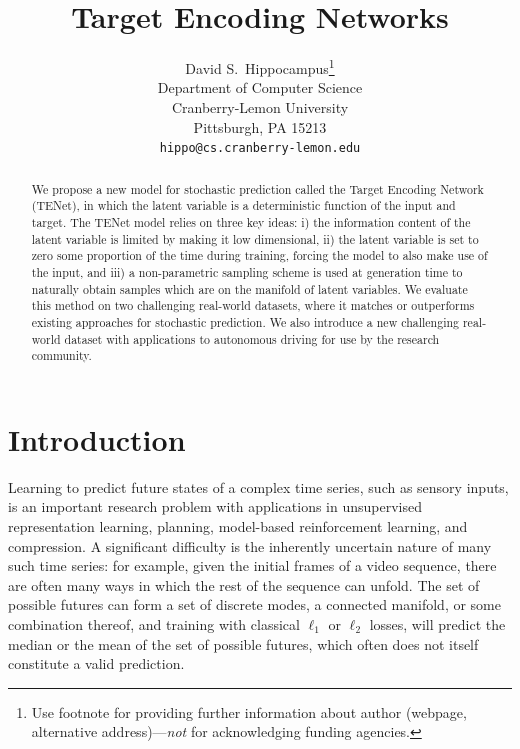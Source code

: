 \documentclass{article}
\title{Target Encoding Networks}
\author{
  David S.~Hippocampus\thanks{Use footnote for providing further
    information about author (webpage, alternative
    address)---\emph{not} for acknowledging funding agencies.} \\
  Department of Computer Science\\
  Cranberry-Lemon University\\
  Pittsburgh, PA 15213 \\
  \texttt{hippo@cs.cranberry-lemon.edu} \\
}
\begin{document}

\maketitle

\begin{abstract}
  We propose a new model for stochastic prediction called the Target Encoding Network (TENet), in which the latent variable is a deterministic function of the input and target.
The TENet model relies on three key ideas: i) the information content of the latent variable is limited by making it low dimensional, ii) the latent variable is set to zero some proportion of the time during training, forcing the model to also make use of the input, and iii) a non-parametric sampling scheme is used at generation time to naturally obtain samples which are on the manifold of latent variables.
  We evaluate this method on two challenging real-world datasets, where it matches or outperforms existing approaches for stochastic prediction.
  We also introduce a new challenging real-world dataset with applications to autonomous driving for use by the research community.
\end{abstract}


\section{Introduction}

Learning to predict future states of a complex time series, such as sensory inputs, is an important research problem with applications in unsupervised representation learning, planning, model-based reinforcement learning, and compression.
A significant difficulty is the inherently uncertain nature of many such time series: for example, given the initial frames of a video sequence, there are often many ways in which the rest of the sequence can unfold.
The set of possible futures can form a set of discrete modes, a connected manifold, or some combination thereof, and training with classical $\ell_1$ or $\ell_2$ losses, will predict the median or the mean of the set of possible futures, which often does not itself constitute a valid prediction.
\end{document}
